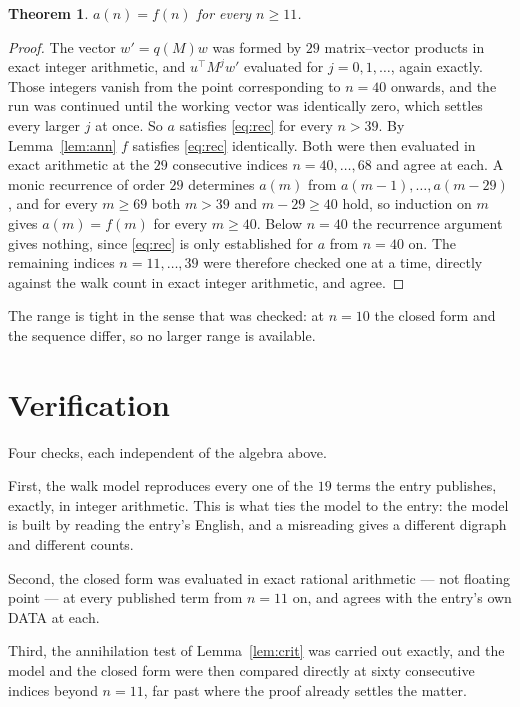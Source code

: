 \documentclass[11pt,a4paper]{article}
\theoremstyle{plain}
\newtheorem{theorem}{Theorem}
\theoremstyle{definition}
\begin{document}
\begin{theorem}
$a(n)=f(n)$ for every $n\ge11$.
\end{theorem}

\begin{proof}
The vector $w'=q(M)w$ was formed by $29$ matrix--vector products in exact integer
arithmetic, and $u^{\!\top}M^{j}w'$ evaluated for $j=0,1,\dots$, again exactly. Those integers
vanish from the point corresponding to $n=40$ onwards, and the run was continued until the
working vector was identically zero, which settles every larger $j$ at once. So $a$ satisfies
\eqref{eq:rec} for every $n>39$. By Lemma~\ref{lem:ann} $f$ satisfies \eqref{eq:rec}
identically. Both were then evaluated in exact arithmetic at the $29$ consecutive indices
$n=40,\dots,68$ and agree at each. A monic recurrence of order $29$
determines $a(m)$ from $a(m-1),\dots,a(m-29)$, and for every $m\ge69$ both
$m>39$ and $m-29\ge40$ hold, so induction on $m$ gives $a(m)=f(m)$ for every
$m\ge40$.
Below $n=40$ the recurrence argument gives nothing, since \eqref{eq:rec} is only
established for $a$ from $n=40$ on. The remaining indices $n=11,\dots,39$ were
therefore checked one at a time, directly against the walk count in exact integer arithmetic,
and agree.
\end{proof}

The range is tight in the sense that was checked: at $n=10$ the closed form and the sequence differ, so no larger range is available.

\section{Verification}

Four checks, each independent of the algebra above.

First, the walk model reproduces every one of the $19$ terms the entry publishes,
exactly, in integer arithmetic. This is what ties the model to the entry: the model is built
by reading the entry's English, and a misreading gives a different digraph and different
counts.

Second, the closed form was evaluated in exact rational arithmetic --- not floating point ---
at every published term from $n=11$ on, and agrees with the entry's own DATA at each.

Third, the annihilation test of Lemma~\ref{lem:crit} was carried out exactly, and the model
and the closed form were then compared directly at sixty consecutive indices beyond
$n=11$, far past where the proof already settles the matter.
\end{document}
